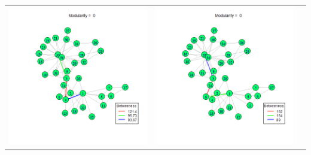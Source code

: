 \documentclass[letterpaper,11pt]{report}
\begin{document}
\begin{savenotes}
\begin{table}[htbp]
\begin{tabular}{ccc}
			\includegraphics[scale=0.28]{karateClub-community-0007.png} &
			\includegraphics[scale=0.28]{karateClub-community-0008.png} & 

\end{tabular}
\end{table}
\end{savenotes}
\end{document}
